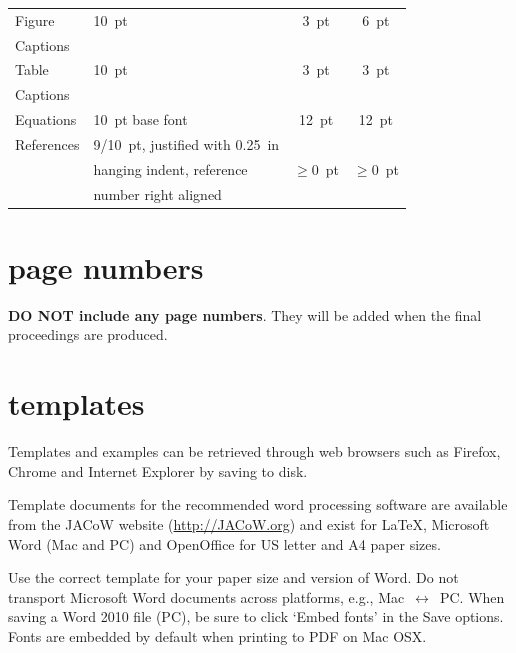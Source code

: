 \documentclass[a4paper,
              ]{jacow}
\begin{document}
\begin{table}[h!t]
\begin{tabular}{@{}llcc@{}}
        \midrule
         Figure        & \SI{10}{pt}                 & \SI{3}{pt}           & \SI{6}{pt}  \\
         Captions      &                             &                 &      \\
        \midrule
         Table         & \SI{10}{pt}                      & \SI{3}{pt}           & \SI{3}{pt}  \\
         Captions      &                             &                 &      \\
        \midrule
         Equations     & \SI{10}{pt} base font            & \SI{12}{pt}          & \SI{12}{pt} \\
        \midrule
         References    & \SI{9/10}{pt}, justified with  \SI{0.25}{in} &      &  \\
                       & hanging indent, reference   & $\ge$\SI{0}{pt} & $\ge$\SI{0}{pt}  \\
                       & number right aligned     &                 &        \\
        \bottomrule
    \end{tabular}
\end{table}

\section{page numbers}

\textbf{DO NOT include any page numbers}. They will be added
when the final proceedings are produced.

\section{templates}

Templates and examples can be retrieved through web
browsers such as Firefox, Chrome and Internet Explorer by saving to disk.

Template documents for the recommended word processing software are
available from the JACoW website (\url{http://JACoW.org}) and exist for
\LaTeX, Microsoft Word (Mac and PC) and OpenOffice for US letter and A4 paper sizes.

Use the correct template for your paper size and version of Word.
Do not transport Microsoft Word documents across platforms, e.g.,
Mac~$\leftrightarrow$~PC. When saving a Word 2010 file (PC), be sure
to click `Embed fonts' in the Save options. Fonts are embedded by default
when printing to PDF on Mac OSX.
\end{document}
